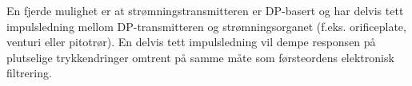 En fjerde mulighet er at strømningstransmitteren er DP-basert og har delvis tett impulsledning mellom DP-transmitteren og strømningsorganet (f.eks. orificeplate, venturi eller pitotrør). En delvis tett impulsledning vil dempe responsen på plutselige trykkendringer omtrent på samme måte som førsteordens elektronisk filtrering.


